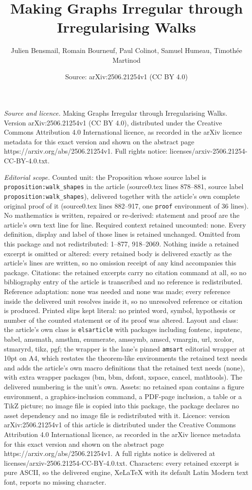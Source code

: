 \documentclass[10pt,a4paper]{amsart}
\title[Making Graphs Irregular through Irregularising Walks]{Making Graphs Irregular through Irregularising Walks}
\author{Julien Bensmail, Romain Bourneuf, Paul Colinot, Samuel Humeau, Timoth\'ee Martinod}
\date{Source: arXiv:2506.21254v1 (CC BY 4.0)}
\begin{document}
\maketitle

\noindent\emph{Source and licence.} Making Graphs Irregular through Irregularising Walks. Version arXiv:2506.21254v1 (CC BY 4.0), distributed under the Creative Commons Attribution 4.0 International licence, as recorded in the arXiv licence metadata for this exact version and shown on the abstract page https://arxiv.org/abs/2506.21254v1. Full rights notice: licenses/arxiv-2506.21254-CC-BY-4.0.txt.\par\smallskip

\noindent\textit{Editorial scope.} Counted unit: the Proposition whose source label is \texttt{proposition:walk\_shapes} in the article (source0.tex lines 878--881, source label \texttt{proposition:walk\_shapes}), delivered together with the article's own complete original proof of it (source0.tex lines 882--917, one \texttt{proof} environment of 36 lines). No mathematics is written, repaired or re-derived: statement and proof are the article's own text line for line. Required context retained uncounted: none. Every definition, display and label of those lines is retained unchanged. Omitted from this package and not redistributed: 1--877, 918--2069. Nothing inside a retained excerpt is omitted or altered: every retained body is delivered exactly as the article's lines are written, so no omission receipt of any kind accompanies this package. Citations: the retained excerpts carry no citation command at all, so no bibliography entry of the article is transcribed and no reference is redistributed. Reference adaptation: none was needed and none was made; every reference inside the delivered unit resolves inside it, so no unresolved reference or citation is produced. Printed slips kept literal: no printed word, symbol, hypothesis or number of the counted statement or of its proof was altered. Layout and class: the article's own class is \texttt{elsarticle} with packages including fontenc, inputenc, babel, amsmath, amsthm, enumerate, amssymb, amscd, vmargin, url, xcolor, stmaryrd, tikz, pgf; the wrapper is the lane's pinned \texttt{amsart} editorial wrapper at 10pt on A4, which restates the theorem-like environments the retained text needs and adds the article's own macro definitions that the retained text needs (none), with extra wrapper packages (bm, bbm, dsfont, xspace, cancel, mathtools). The delivered numbering is the unit's own. Assets: no retained span contains a figure environment, a graphics-inclusion command, a PDF-page inclusion, a table or a TikZ picture; no image file is copied into this package, the package declares no asset dependency and no image file is redistributed with it. Licence: version arXiv:2506.21254v1 of this article is distributed under the Creative Commons Attribution 4.0 International licence, as recorded in the arXiv licence metadata for this exact version and shown on the abstract page https://arxiv.org/abs/2506.21254v1. A full rights notice is delivered at licenses/arxiv-2506.21254-CC-BY-4.0.txt. Characters: every retained excerpt is pure ASCII, so the delivered engine, XeLaTeX with its default Latin Modern text font, reports no missing character.
\end{document}
